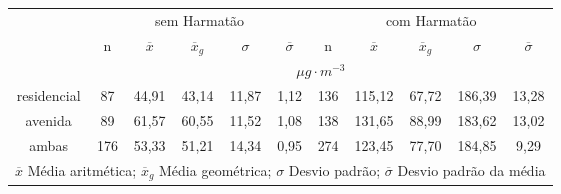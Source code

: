 \begin{tabular}{cccccc|ccccc}
  \hline
  &  \multicolumn{5}{c|}{sem Harmatão} & \multicolumn{5}{c}{com Harmatão} \\
 & n & $\overline{x}$ & $\overline{x}_g$ & $\sigma$ & $\overline{\sigma}$
 & n & $\overline{x}$ & $\overline{x}_g$ & $\sigma$ & $\overline{\sigma}$ \\
                       \hline & \multicolumn{10}{c}{$\mu g \cdot m^{-3}$} \\  \hline
residencial & 87 & 44,91 & 43,14 & 11,87 & 1,12 & 136 & 115,12 & 67,72 & 186,39 & 13,28 \\ 
  avenida & 89 & 61,57 & 60,55 & 11,52 & 1,08 & 138 & 131,65 & 88,99 & 183,62 & 13,02 \\ 
  ambas & 176 & 53,33 & 51,21 & 14,34 & 0,95 & 274 & 123,45 & 77,70 & 184,85 & 9,29 \\ 
   \hline
\multicolumn{11}{l}{$\overline{x}$ Média aritmética; $\overline{x}_g$ Média geométrica;
	$\sigma$ Desvio padrão; $\overline{\sigma}$ Desvio padrão da média} \\
   \hline
\end{tabular}
